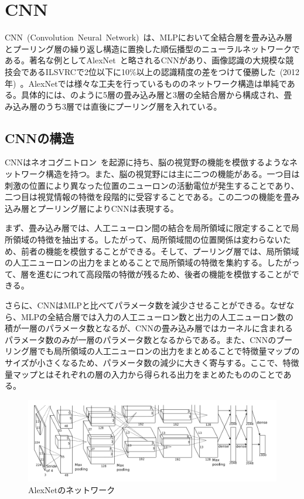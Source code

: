 \section{CNN}

CNN~(Convolution~Neural~Network)~は、MLPにおいて全結合層を畳み込み層とプーリング層の繰り返し構造に置換した順伝播型のニューラルネットワークである。著名な例としてAlexNet~\cite{AlexNet}と略されるCNNがあり、画像認識の大規模な競技会であるILSVRCで2位以下に10\%以上の認識精度の差をつけて優勝した~(2012年)~。AlexNetでは様々な工夫を行っているもののネットワーク構造は単純である。具体的には、のように5層の畳み込み層と3層の全結合層から構成され、畳み込み層のうち3層では直後にプーリング層を入れている。

\subsection{CNNの構造}

CNNはネオコグニトロン~\cite{neocognition}を起源に持ち、脳の視覚野の機能を模倣するようなネットワーク構造を持つ。また、脳の視覚野には主に二つの機能がある。一つ目は刺激の位置により異なった位置のニューロンの活動電位が発生することであり、二つ目は視覚情報の特徴を段階的に受容することである。この二つの機能を畳み込み層とプーリング層によりCNNは表現する。

まず、畳み込み層では、人工ニューロン間の結合を局所領域に限定することで局所領域の特徴を抽出する。したがって、局所領域間の位置関係は変わらないため、前者の機能を模倣することができる。そして、プーリング層では、局所領域の人工ニューロンの出力をまとめることで局所領域の特徴を集約する。したがって、層を進むにつれて高段階の特徴が残るため、後者の機能を模倣することができる。

さらに、CNNはMLPと比べてパラメータ数を減少させることができる。なぜなら、MLPの全結合層では入力の人工ニューロン数と出力の人工ニューロン数の積が一層のパラメータ数となるが、CNNの畳み込み層ではカーネルに含まれるパラメータ数のみが一層のパラメータ数となるからである。また、CNNのプーリング層でも局所領域の人工ニューロンの出力をまとめることで特徴量マップのサイズが小さくなるため、パラメータ数の減少に大きく寄与する。ここで、特徴量マップとはそれぞれの層の入力から得られる出力をまとめたもののことである。

\begin{figure}[b]
\centering
\includegraphics[width=\hsize]{figure/alex.png}
\caption{AlexNetのネットワーク}
\label{fig:Alex}
\end{figure}


